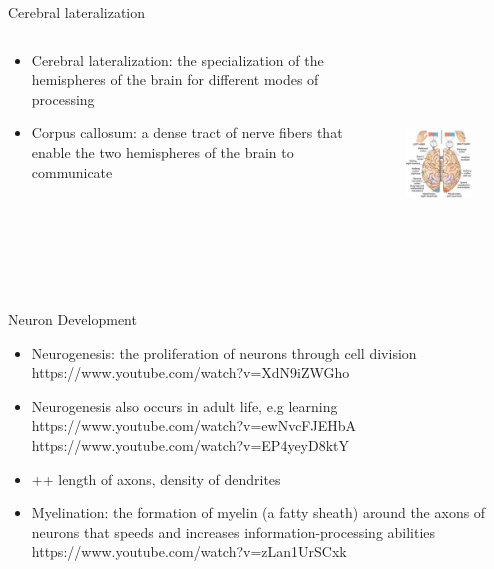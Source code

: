 \documentclass{beamer} %
\begin{document}
\begin{frame}{Cerebral lateralization}
\begin{columns}
\begin{column}{0.4\textwidth}
\begin{itemize}
    \item Cerebral lateralization: the specialization of the hemispheres of the brain for different modes of processing
    \item Corpus callosum: a dense tract of nerve fibers that enable the two hemispheres of the brain to communicate
\end{itemize}
\end{column}
\begin{column}{0.55\textwidth}
\begin{figure}
    \includegraphics[height = 6cm, keepaspectration]{brain.jpg}
\end{figure}
\end{column}
\end{columns}
\end{frame}
\begin{frame}{Neuron Development}
\begin{itemize}
    \item Neurogenesis: the proliferation of neurons through cell division
    \\ https://www.youtube.com/watch?v=XdN9iZWGho
    \item Neurogenesis also occurs in adult life, e.g learning
    \\ https://www.youtube.com/watch?v=ewNvcFJEHbA
    \\ https://www.youtube.com/watch?v=EP4yeyD8ktY
    \item ++ length of axons, density of dendrites
    \pause
    \item Myelination: the formation of myelin (a fatty sheath) around the axons of neurons that speeds and increases information-processing abilities
   \\  https://www.youtube.com/watch?v=zLan1UrSCxk
\end{itemize}
\end{frame}
\end{document}
